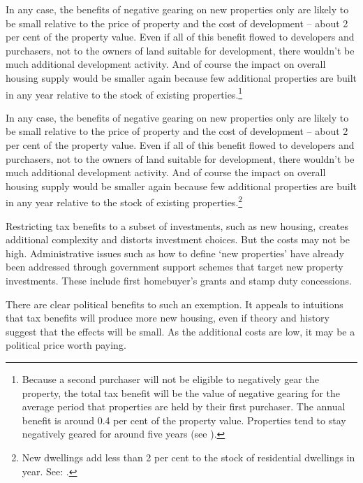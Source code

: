 In any case, the benefits of negative gearing on new properties only are likely to be small relative to the price of property and the cost of development – about 2 per cent of the property value.  Even if all of this benefit flowed to developers and purchasers, not to the owners of land suitable for development, there wouldn’t be much additional development activity. And of course the impact on overall housing supply would be smaller again because few additional properties are built in any year relative to the stock of existing properties.\footnote{Because a second purchaser will not be eligible to negatively gear the property, the total tax benefit will be the value of negative gearing for the average period that properties are held by their first purchaser. The annual benefit is around 0.4 per cent of the property value. Properties tend to stay negatively geared for around five years (see \stopifendnote{}).} 

In any case, the benefits of negative gearing on new properties only are likely to be small relative to the price of property and the cost of development – about 2 per cent of the property value.  Even if all of this benefit flowed to developers and purchasers, not to the owners of land suitable for development, there wouldn’t be much additional development activity. And of course the impact on overall housing supply would be smaller again because few additional properties are built in any year relative to the stock of existing properties.\footnote{New dwellings add less than 2 per cent to the stock of residential dwellings in year. See: \textcite[][47]{ACILConsulting2015AnalysisofNG}.} 

Restricting tax benefits to a subset of investments, such as new housing, creates additional complexity and distorts investment choices. But the costs may not be high. Administrative issues such as how to define ‘new properties’ have already been addressed through government support schemes that target new property investments. These include first homebuyer’s grants and stamp duty concessions. 

There are clear political benefits to such an exemption.  It appeals to intuitions that tax benefits will produce more new housing, even if theory and history suggest that the effects will be small.  As the additional costs are low, it may be a political price worth paying.

